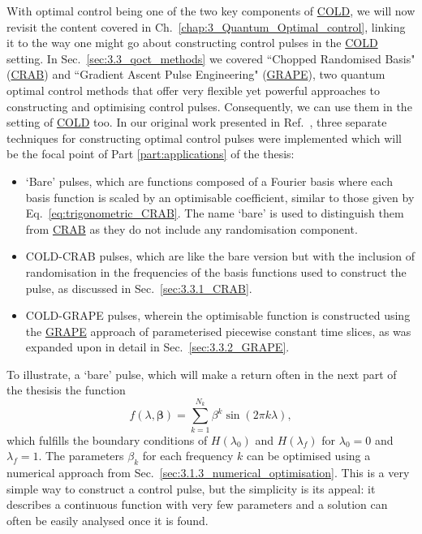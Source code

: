 \documentclass[a4paper,oneside,11pt]{book}
\newcommand{\betabb}{\boldsymbol{\beta}}
\newcommand{\acrref}[1]{\hyperref[acr:#1]{#1}}
\providecommand{\DIFaddtex}[1]{{\protect\color{blue}\uwave{#1}}} %
\providecommand{\DIFaddbegin}{} %
\providecommand{\DIFaddend}{} %
\providecommand{\DIFadd}[1]{\texorpdfstring{\DIFaddtex{#1}}{#1}} %
\newcommand{\DIFaddincludegraphics}[2][]{{\color{blue}\fbox{\DIFOincludegraphics[#1]{#2}}}} %
\DeclareRobustCommand{\DIFaddbegin}{\DIFOaddbegin \let\includegraphics\DIFaddincludegraphics} %
\DeclareRobustCommand{\DIFaddend}{\DIFOaddend \let\includegraphics\DIFOincludegraphics} %
\begin{document}
With optimal control being one of the two key components of \acrref{COLD}, we will now revisit the content covered in Ch.~\ref{chap:3_Quantum_Optimal_control}, linking it to the way one might go about constructing control pulses in the \acrref{COLD} setting. In Sec.~\ref{sec:3.3_qoct_methods} we covered ``Chopped Randomised Basis" (\acrref{CRAB}) and ``Gradient Ascent Pulse Engineering" (\acrref{GRAPE}), two quantum optimal control methods that offer very flexible yet powerful approaches to constructing and optimising control pulses. Consequently, we can use them in the setting of \acrref{COLD} too. In our original work presented in Ref.~\cite{cepaite_counterdiabatic_2023}, three separate techniques for constructing optimal control pulses were implemented which will be the focal point of Part \ref{part:applications} of the thesis:
\begin{itemize}
    \item `Bare' pulses, which are functions composed of a Fourier basis where each basis function is scaled by an optimisable coefficient, similar to those given by Eq.~\ref{eq:trigonometric_CRAB}. The name `bare' is used to distinguish them from \acrref{CRAB} as they do not include any randomisation component.
    \item COLD-CRAB pulses, which are like the bare version but with the inclusion of randomisation in the frequencies of the basis functions used to construct the pulse, as discussed in Sec.~\ref{sec:3.3.1_CRAB}.
    \item COLD-GRAPE pulses, wherein the optimisable function is constructed using the \acrref{GRAPE} approach of parameterised piecewise constant time slices, as was expanded upon in detail in Sec.~\ref{sec:3.3.2_GRAPE}. 
\end{itemize}

To illustrate, a `bare' pulse, which will make a return often in the next part of the thesis\DIFaddbegin \DIFadd{, }\DIFaddend is the function
\begin{equation}\label{eq:bare_pulse}
    f(\lambda, \betabb) = \sum_{k=1}^{N_k} \beta^k \sin (2 \pi k \lambda),
\end{equation}
which fulfills the boundary conditions of $H(\lambda_0)$ and $H(\lambda_f)$ for $\lambda_0 = 0$ and $\lambda_f = 1$. The parameters $\beta_k$ for each frequency $k$ can be optimised using a numerical approach from Sec.~\ref{sec:3.1.3_numerical_optimisation}. This is a very simple way to construct a control pulse, but the simplicity is its appeal: it describes a continuous function with very few parameters and a solution can often be easily analysed once it is found.
\end{document}
